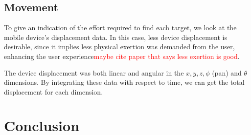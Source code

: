 \documentclass[runningheads]{llncs}
\newcommand\todo[1]{\textcolor{red}{#1}}
\begin{document}
\subsection{Movement}

To give an indication of the effort required to find each target, we look at the mobile device's displacement data. 
In this case, less device displacement is desirable, since it implies less physical exertion was demanded from the user, enhancing the user experience\todo{maybe cite paper that says less exertion is good}.

The device displacement was both linear and angular in the $x, y, z, \phi$ (pan) and $\theta$ dimensions.
By integrating these data with respect to time, we can get the total displacement for each dimension.

\section{Conclusion}



\end{document}
